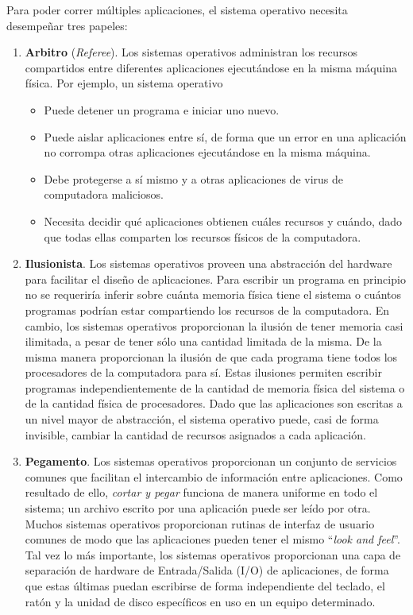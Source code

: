 \documentclass[10pt]{book}
\begin{document}
Para poder correr múltiples aplicaciones, el sistema operativo necesita desempeñar tres papeles:
\begin{enumerate}
\item \textbf{Arbitro} (\textit{Referee}). Los sistemas operativos administran los recursos compartidos entre diferentes aplicaciones ejecutándose en la misma máquina física. Por ejemplo, un sistema operativo
	\begin{itemize}
	\item Puede detener un programa e iniciar uno nuevo.
	\item Puede aislar aplicaciones entre sí, de forma que un error en una aplicación no corrompa otras aplicaciones ejecutándose en la misma máquina.
	\item Debe protegerse a sí mismo y a otras aplicaciones de virus de computadora maliciosos.
	\item Necesita decidir qué aplicaciones obtienen cuáles recursos y cuándo, dado que todas ellas comparten los recursos físicos de la computadora. 
	\end{itemize}
	
\item \textbf{Ilusionista}. Los sistemas operativos proveen una abstracción del hardware para facilitar el diseño de aplicaciones. Para escribir un programa en principio no se requeriría inferir sobre cuánta memoria física tiene el sistema o cuántos programas podrían estar compartiendo los recursos de la computadora. En cambio, los sistemas operativos proporcionan la ilusión de tener memoria casi ilimitada, a pesar de tener sólo una cantidad limitada de la misma. De la misma manera proporcionan la ilusión de que cada programa tiene todos los procesadores de la computadora para sí. Estas ilusiones permiten escribir programas independientemente de la cantidad de memoria física del sistema o de la cantidad física de procesadores. Dado que las aplicaciones son escritas a un nivel mayor de abstracción, el sistema operativo puede, casi de forma invisible, cambiar la cantidad de recursos asignados a cada aplicación.

\item \textbf{Pegamento}. Los sistemas operativos proporcionan un conjunto de servicios comunes que facilitan el intercambio de información entre aplicaciones. Como resultado de ello, \textit{cortar y pegar} funciona de manera uniforme en todo el sistema; un archivo escrito por una aplicación puede ser leído por otra. Muchos sistemas operativos proporcionan rutinas de interfaz de usuario comunes de modo que las aplicaciones pueden tener el mismo ``\textit{look and feel}''. Tal vez lo más importante, los sistemas operativos proporcionan una capa de separación de hardware de Entrada/Salida (I/O) de aplicaciones, de forma que estas últimas puedan escribirse de forma independiente del teclado, el ratón y la unidad de disco específicos en uso en un equipo determinado.
\end{enumerate}
\end{document}
